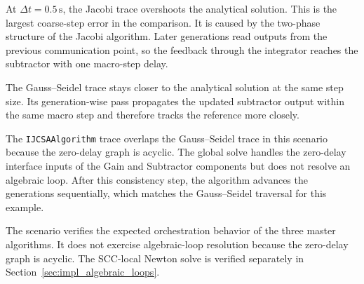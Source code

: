 At $\Delta t = 0.5\,\mathrm{s}$, the Jacobi trace overshoots the analytical solution.
This is the largest coarse-step error in the comparison.
It is caused by the two-phase structure of the Jacobi algorithm.
Later generations read outputs from the previous communication point, so the feedback through the integrator reaches the subtractor with one macro-step delay.

The Gauss--Seidel trace stays closer to the analytical solution at the same step size.
Its generation-wise pass propagates the updated subtractor output within the same macro step and therefore tracks the reference more closely.

The \texttt{IJCSAAlgorithm} trace overlaps the Gauss--Seidel trace in this scenario because the zero-delay graph is acyclic.
The global solve handles the zero-delay interface inputs of the Gain and Subtractor components but does not resolve an algebraic loop.
After this consistency step, the algorithm advances the generations sequentially, which matches the Gauss--Seidel traversal for this example.

The scenario verifies the expected orchestration behavior of the three master algorithms.
It does not exercise algebraic-loop resolution because the zero-delay graph is acyclic.
The \ac{SCC}-local Newton solve is verified separately in Section~\ref{sec:impl_algebraic_loops}.
